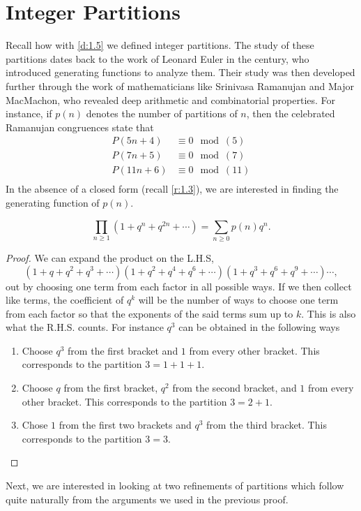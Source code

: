\section{Integer Partitions}
Recall how with \cref{d:1.5} we defined integer partitions. The study of these partitions dates back to the work of Leonard Euler in the  century, who introduced generating functions to analyze them. Their study was then developed further through the work of mathematicians like Srinivasa Ramanujan and Major MacMachon, who revealed deep arithmetic and combinatorial properties. For instance, if $p(n)$ denotes the number of partitions of $n$, then the celebrated Ramanujan congruences state that
\begin{align*}
P(5n+4)&\equiv 0\mod{(5)} \\
P(7n+5)&\equiv 0\mod{(7)} \\
P(11n+6)&\equiv 0\mod{(11)} \\ 
\end{align*}
In the absence of a closed form (recall \cref{r:1.3}), we are interested in finding the generating function of $p(n)$.
\begin{claim}\[
\prod_{n\geq 1}(1+q^n+q^{2n}+\cdots) = \sum_{n\geq 0}p(n)q^n.
\]
\label{c:2.1P}
\end{claim}
\begin{proof}
We can expand the product on the L.H.S, \[(1+q+q^2+q^3+\cdots)(1+q^2+q^4+q^6+\cdots)(1+q^3+q^6+q^9+\cdots)\cdots,\] out by choosing one term from each factor in all possible ways. If we then collect like terms, the coefficient of $q^k$ will be the number of ways to choose one term from each factor so that the exponents of the said terms sum up to $k$. This is also what the R.H.S. counts. For instance $q^3$ can be obtained in the following ways
\begin{enumerate}
    \item Choose $q^3$ from the first bracket and $1$ from every other bracket. This corresponds to the partition $3=1+1+1$.
    \item Choose $q$ from the first bracket, $q^2$ from the second bracket, and $1$ from every other bracket. This corresponds to the partition $3=2+1$. 
    \item Chose $1$ from the first two brackets and $q^3$ from the third bracket. This corresponds to the partition $3=3$. 
\end{enumerate}
\end{proof}
Next, we are interested in looking at two refinements of partitions which follow quite naturally from the arguments we used in the previous proof.
